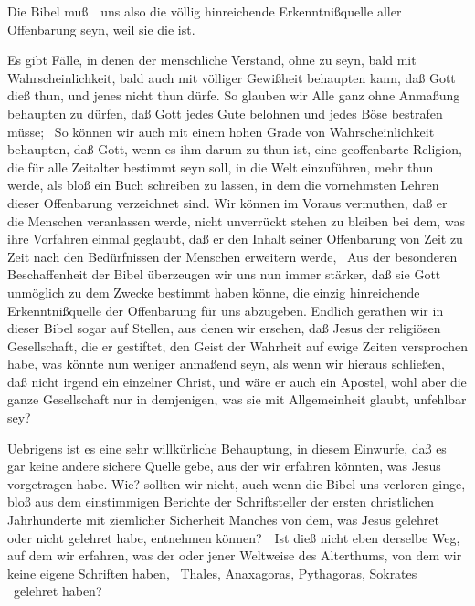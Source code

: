 \begin{aufza}
Die Bibel muß~\ uns also die völlig hinreichende Erkenntnißquelle aller Offenbarung seyn, weil sie die  ist.
\item[\RWbet{Widerlegung.}] 
\begin{aufzb}[1.] \item Es gibt Fälle, in denen der menschliche Verstand, ohne  zu seyn, bald mit Wahrscheinlichkeit, bald auch mit völliger Gewißheit behaupten kann, daß Gott dieß thun, und jenes nicht thun dürfe. So glauben wir Alle ganz ohne Anmaßung behaupten zu dürfen, daß Gott jedes Gute belohnen und jedes Böse bestrafen müsse; \udgl\  So können wir auch mit einem hohen Grade von Wahrscheinlichkeit behaupten, daß Gott, wenn es ihm darum zu thun ist, eine geoffenbarte Religion, die für alle Zeitalter bestimmt seyn soll, in die Welt einzuführen, mehr thun werde, als bloß ein Buch schreiben zu lassen, in dem die vornehmsten Lehren dieser Offenbarung verzeichnet sind. Wir können im Voraus vermuthen, daß er die Menschen veranlassen werde, nicht unverrückt stehen zu bleiben bei dem, was ihre Vorfahren einmal geglaubt, daß er den Inhalt seiner Offenbarung von Zeit zu Zeit nach den Bedürfnissen der Menschen erweitern werde, \usw\ Aus der besonderen Beschaffenheit der Bibel überzeugen wir uns nun immer stärker, daß sie Gott unmöglich zu dem Zwecke bestimmt haben könne, die einzig hinreichende Erkenntnißquelle der Offenbarung für uns abzugeben. Endlich gerathen wir in dieser Bibel sogar auf Stellen, aus denen wir ersehen, daß Jesus der religiösen Gesellschaft, die er gestiftet, den Geist der Wahrheit auf ewige Zeiten versprochen habe, was könnte nun weniger anmaßend seyn, als wenn wir hieraus schließen, daß nicht irgend ein einzelner Christ, und wäre er auch ein Apostel, wohl aber die ganze Gesellschaft nur in demjenigen, was sie mit Allgemeinheit glaubt, unfehlbar sey?
\item Uebrigens ist es eine sehr willkürliche Behauptung, in diesem Einwurfe, daß es  gar keine andere sichere Quelle gebe, aus der wir erfahren könnten, was Jesus vorgetragen habe. Wie? sollten wir nicht, auch wenn die Bibel uns verloren ginge, bloß aus dem einstimmigen Berichte der Schriftsteller der ersten christlichen Jahrhunderte mit ziemlicher Sicherheit Manches von dem, was Jesus gelehret oder nicht gelehret habe, entnehmen können?~\ Ist dieß nicht eben derselbe Weg, auf dem wir erfahren, was der oder jener Weltweise des Alterthums, von dem wir keine eigene Schriften haben, \zB\ Thales, Anaxagoras, Pythagoras, Sokrates \uA\ gelehret haben?

\end{aufzb}
\end{aufza}

